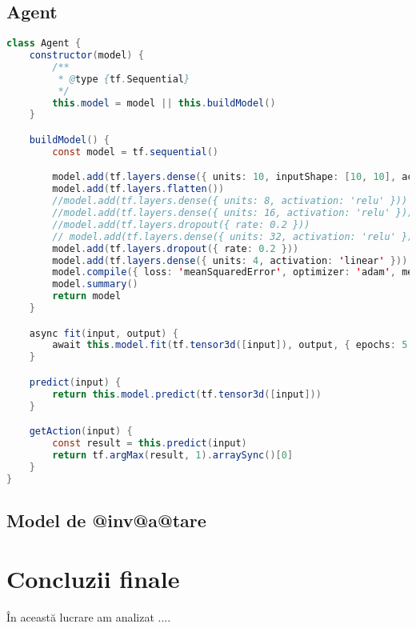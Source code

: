 \section{Agent}

\begin{lstlisting}[language=Java]
class Agent {
    constructor(model) {
        /**
         * @type {tf.Sequential}
         */
        this.model = model || this.buildModel()
    }

    buildModel() {
        const model = tf.sequential()

        model.add(tf.layers.dense({ units: 10, inputShape: [10, 10], activation: 'relu' }))
        model.add(tf.layers.flatten())
        //model.add(tf.layers.dense({ units: 8, activation: 'relu' }))
        //model.add(tf.layers.dense({ units: 16, activation: 'relu' }))
        //model.add(tf.layers.dropout({ rate: 0.2 }))
        // model.add(tf.layers.dense({ units: 32, activation: 'relu' }))
        model.add(tf.layers.dropout({ rate: 0.2 }))
        model.add(tf.layers.dense({ units: 4, activation: 'linear' }))
        model.compile({ loss: 'meanSquaredError', optimizer: 'adam', metrics: ['accuracy'] })
        model.summary()
        return model
    }

    async fit(input, output) {
        await this.model.fit(tf.tensor3d([input]), output, { epochs: 5 })
    }

    predict(input) {
        return this.model.predict(tf.tensor3d([input]))
    }

    getAction(input) {
        const result = this.predict(input)
        return tf.argMax(result, 1).arraySync()[0]
    }
}
\end{lstlisting}

\section{Model de @inv@a@tare}




\chapter*{Concluzii finale}



\^ In aceast\u a lucrare am analizat ....
